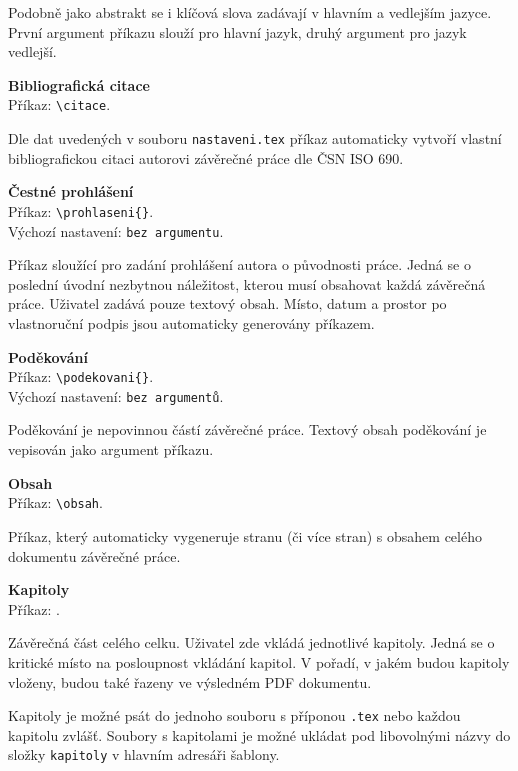 Podobně jako abstrakt se i klíčová slova zadávají v hlavním a vedlejším jazyce. První argument příkazu slouží pro hlavní jazyk, druhý argument pro jazyk vedlejší.

\vspace{8pt}

\textbf{Bibliografická citace}\\
Příkaz: \verb|\citace|.

Dle dat uvedených v souboru \verb|nastaveni.tex| příkaz automaticky vytvoří vlastní bibliografickou citaci autorovi závěrečné práce dle ČSN ISO 690.

\vspace{8pt}

\textbf{Čestné prohlášení}\\
Příkaz: \verb|\prohlaseni{}|.\\
Výchozí nastavení: \verb|bez argumentu|.

Příkaz sloužící pro zadání prohlášení autora o původnosti práce. Jedná se o poslední úvodní nezbytnou náležitost, kterou musí obsahovat každá závěrečná práce. Uživatel zadává pouze textový obsah. Místo, datum a prostor po vlastnoruční podpis jsou automaticky generovány příkazem.

\vspace{8pt}

\textbf{Poděkování}\\
Příkaz: \verb|\podekovani{}|.\\
Výchozí nastavení: \verb|bez argumentů|.

Poděkování je nepovinnou částí závěrečné práce. Textový obsah poděkování je vepisován jako argument příkazu.


\vspace{8pt}

\textbf{Obsah}\\
Příkaz: \verb|\obsah|.

Příkaz, který automaticky vygeneruje stranu (či více stran) s obsahem celého dokumentu závěrečné práce.


\vspace{8pt}

\textbf{Kapitoly}\\
Příkaz: \verb||.

Závěrečná část celého celku. Uživatel zde vkládá jednotlivé kapitoly. Jedná se o kritické místo na posloupnost vkládání kapitol. V pořadí, v jakém budou kapitoly vloženy, budou také řazeny ve výsledném PDF dokumentu.

Kapitoly je možné psát do jednoho souboru s příponou \verb|.tex| nebo každou kapitolu zvlášť. Soubory s kapitolami je možné ukládat pod libovolnými názvy do složky \verb|kapitoly| v hlavním adresáři šablony.

